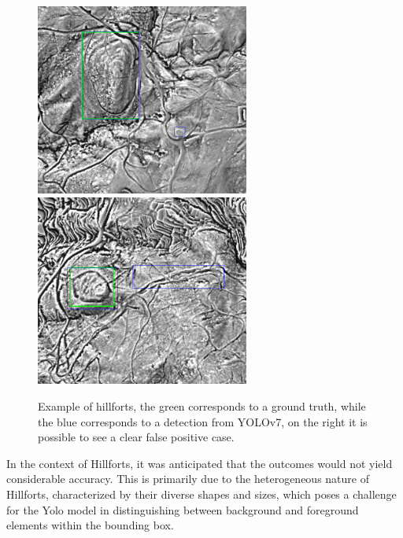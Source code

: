 \begin{figure}[H]
    \centering
    {{\includegraphics[width=7cm]{images/examples_inference/yolov7/castros/1.png} }}
    \qquad
  {{\includegraphics[width=7cm]{images/examples_inference/yolov7/castros/2.png} }}
    \caption{Example of hillforts, the green corresponds to a ground truth, while the blue corresponds to a detection from YOLOv7, on the right it is possible to see a clear false positive case.}
    \label{yoloinferenceexem2}
\end{figure}

In the context of Hillforts, it was anticipated that the outcomes would not yield considerable accuracy. This is primarily due to the heterogeneous nature of Hillforts, characterized by their diverse shapes and sizes, which poses a challenge for the Yolo model in distinguishing between background and foreground elements within the bounding box.